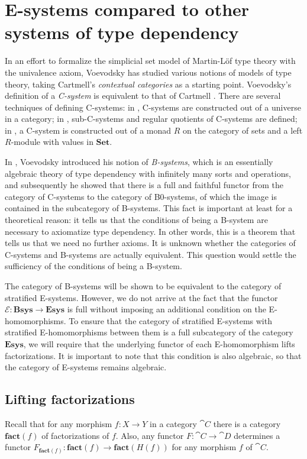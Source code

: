 \section{E-systems compared to other systems of type dependency}\label{sec:esys_compared}
In an effort to formalize the simplicial set model of Martin-L\"of type theory
with the univalence axiom, Voevodsky has studied various notions of models of
type theory, taking Cartmell's \emph{contextual categories} as a starting
point. Voevodsky's definition of a \emph{C-system} is equivalent to that of Cartmell
\cite{VV_C-systems_quotients}. There are several techniques of defining 
C-systems: in \cite{VV_Csys_univ}, C-systems are constructed out of a universe
in a category; in \cite{VV_C-systems_quotients}, sub-C-systems and regular
quotients of C-systems are defined; in \cite{VV_C-systems_monad}, a C-system
is constructed out of a monad $R$ on the category of sets and a left $R$-module
with values in $\mathbf{Set}$. 

In \cite{VV_B-systems}, Voevodsky introduced his notion of \emph{B-systems}, which is
an essentially algebraic theory of type dependency with infinitely many sorts 
and operations, and subsequently he showed that there is a full and faithful
functor from the category of C-systems to the category of B0-systems, of which
the image is contained in the subcategory of B-systems. This fact is important at least
for a theoretical reason: it tells us that the conditions of being a B-system
are necessary to axiomatize type dependency. In other words,
this is a theorem that tells us that we need no further axioms. It is
unknown whether the categories of C-systems and B-systems are actually equivalent.
This question would settle the sufficiency of the conditions of being a B-system.

The category of B-systems will be shown to be equivalent to the category of
stratified E-systems. However, we do not arrive at the fact that the functor
$\mathcal{E}:\mathbf{Bsys}\to\mathbf{Esys}$ is full without imposing an additional
condition on the E-homomorphisms. 
To ensure that the category of stratified E-systems with stratified 
E-homomorphisms between them is a full subcategory of the category 
$\mathbf{Esys}$, we will require that the underlying functor of each E-homomorphism
lifts factorizations. It is
important to note that this condition is also algebraic, so that the category
of E-systems remains algebraic.

\subsection{Lifting factorizations}
Recall
that for any morphism $f:X\to Y$ in a category $\cat{C}$ there is a category
$\mathbf{fact}(f)$ of factorizations of $f$. Also, any functor $F:\cat{C}\to\cat{D}$
determines a functor $F_{\mathbf{fact}(f)}:\mathbf{fact}(f)\to\mathbf{fact}(H(f))$
for any morphism $f$ of $\cat{C}$.

